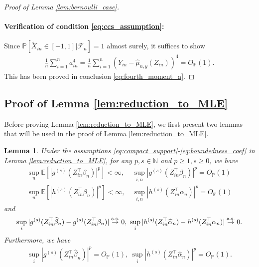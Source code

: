 \documentclass[12pt]{article}
\newtheorem{lemma}{Lemma}
\theoremstyle{definition}
\def\P{\mathbb{P}}
\def\P{\mathbb{P}}
\newcommand{\E}{\mathbb E}								%
\renewcommand{\P}{\mathbb{P}}							%
\newcommand{\srz}{Z}									%
\newcommand{\srxk}{\widetilde X}						%
\newcommand{\sry}{Y}									%
\begin{document}
\begin{proof}[Proof of Lemma \ref{lem:bernoulli_case}]
  \paragraph{Verification of condition \eqref{eq:ccs_assumption}:}

  Since $\P[\srxk_{in}\in [-1,1]|\mathcal{F}_n]=1$ almost surely, it suffices to show 
  \begin{align*}
    \frac{1}{n}\sum_{i=1}^n a_{in}^4=\frac{1}{n}\sum_{i=1}^n (\sry_{in}-\widehat{\mu}_{n,y}(\srz_{in}))^4=O_{\P}(1).
  \end{align*}
  This has been proved in conclusion \eqref{eq:fourth_moment_a}.


\end{proof}



\subsection{Proof of Lemma \ref{lem:reduction_to_MLE}}

Before proving Lemma \ref{lem:reduction_to_MLE}, we first present two lemmas that will be used in the proof of Lemma \ref{lem:reduction_to_MLE}.

\begin{lemma}\label{lem:almost_sure_convergence_moments}
  Under the assumptions \eqref{eq:compact_support}-\eqref{eq:boundedness_coef} in Lemma \ref{lem:reduction_to_MLE}, for any $p,s\in\mathbb{N}$ and $p\geq 1,s\geq 0$, we have 
  \begin{align}
    \sup_n\E[|g^{(s)}(Z_{in}^\top \beta_n)|^p]<\infty,
    &\label{eq:exact_boundedness_g}
    \ \sup_{i,n}|g^{(s)}(Z_{in}^\top \beta_n)|^p=O_{\P}(1)\\
    \sup_n\E[|h^{(s)}(Z_{in}^\top \beta_n)|^p]<\infty,
    &\label{eq:exact_boundedness_h}
    \ \sup_{i,n}|h^{(s)}(Z_{in}^\top \alpha_n)|^p=O_{\P}(1)
  \end{align}
  and 
  \begin{align}\label{eq:as_statement}
    \sup_{i}|g^{(s)}(\srz_{in}^\top \widehat\beta_n)-g^{(s)}(\srz_{in}^\top \beta_n)|\overset{\textnormal{a.s.}}{\rightarrow}0,\ \sup_{i}|h^{(s)}(\srz_{in}^\top \widehat\alpha_n)-h^{(s)}(\srz_{in}^\top \alpha_n)|\overset{\textnormal{a.s.}}{\rightarrow}0.
  \end{align}
  Furthermore, we have 
  \begin{align}\label{eq:stochastic_boundedness}
    \sup_{i}|g^{(s)}(Z_{in}^\top \widehat\beta_n)|^p=O_{\P}(1),\ \sup_{i}|h^{(s)}(Z_{in}^\top \widehat\alpha_n)|^p=O_{\P}(1).
  \end{align}
\end{lemma}
\end{document}
